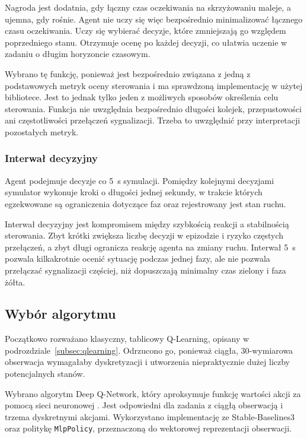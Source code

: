 Nagroda jest dodatnia, gdy łączny czas oczekiwania na skrzyżowaniu maleje, a ujemna, gdy rośnie. Agent nie uczy się więc bezpośrednio minimalizować łącznego czasu oczekiwania. Uczy się wybierać decyzje, które zmniejszają go względem poprzedniego stanu. Otrzymuje ocenę po każdej decyzji, co ułatwia uczenie w zadaniu o długim horyzoncie czasowym.

Wybrano tę funkcję, ponieważ jest bezpośrednio związana z jedną z podstawowych metryk oceny sterowania i ma sprawdzoną implementację w użytej bibliotece. Jest to jednak tylko jeden z możliwych sposobów określenia celu sterowania. Funkcja nie uwzględnia bezpośrednio długości kolejek, przepustowości ani częstotliwości przełączeń sygnalizacji. Trzeba to uwzględnić przy interpretacji pozostałych metryk.

\subsubsection{Interwał decyzyjny}
\label{subsubsec:interwal}

Agent podejmuje decyzje co 5~s symulacji. Pomiędzy kolejnymi decyzjami symulator wykonuje kroki o długości jednej sekundy, w trakcie których egzekwowane są ograniczenia dotyczące faz oraz rejestrowany jest stan ruchu.

Interwał decyzyjny jest kompromisem między szybkością reakcji a stabilnością sterowania. Zbyt krótki zwiększa liczbę decyzji w epizodzie i ryzyko częstych przełączeń, a zbyt długi ogranicza reakcję agenta na zmiany ruchu. Interwał 5~s pozwala kilkakrotnie ocenić sytuację podczas jednej fazy, ale nie pozwala przełączać sygnalizacji częściej, niż dopuszczają minimalny czas zielony i faza żółta.

\subsection{Wybór algorytmu}
\label{subsec:wybor-algorytmu}

Początkowo rozważano klasyczny, tablicowy Q-Learning, opisany w podrozdziale~\ref{subsec:qlearning}. Odrzucono go, ponieważ ciągła, 30-wymiarowa obserwacja wymagałaby dyskretyzacji i utworzenia niepraktycznie dużej liczby potencjalnych stanów.

Wybrano algorytm Deep Q-Network, który aproksymuje funkcję wartości akcji za pomocą sieci neuronowej \cite{mnih2013playing}. Jest odpowiedni dla zadania z ciągłą obserwacją i trzema dyskretnymi akcjami. Wykorzystano implementację ze Stable-Baselines3 oraz politykę \texttt{MlpPolicy}, przeznaczoną do wektorowej reprezentacji obserwacji.

